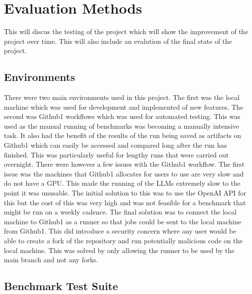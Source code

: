 \documentclass[12pt]{extarticle}
\begin{document}
\newpage
\section{Evaluation Methods}

This will discus the testing of the project which will show the improvement of the project over time. This will also include an evalution of the final state of the project.

\subsection{Environments}

There were two main environments used in this project. The first was the local machine which was used for development and implemented of new features. The second was Github1 workflows which was used for automated testing. This was used as the manual running of benchmarks was becoming a manually intensive task. It also had the benefit of the results of the run being saved as artifacts on Github1 which can easily be accessed and compared long after the run has finished. This was particularly useful for lengthy runs that were carried out overnight.
There were however a few issues with the Github1 workflow. The first issue was the machines that Github1 allocates for users to use are very slow and do not have a GPU. This made the running of the LLMs extremely slow to the point it was unusable. The initial solution to this was to use the OpenAI API for this but the cost of this was very high and was not feasible for a benchmark that might be run on a weekly cadence. The final solution was to connect the local machine to Github1 as a runner so that jobs could be sent to the local machine from Github1. This did introduce a security concern where any user would be able to create a fork of the repository and run potentially malicious code on the local machine. This was solved by only allowing the runner to be used by the main branch and not any forks.

\subsection{Benchmark Test Suite}
\end{document}
